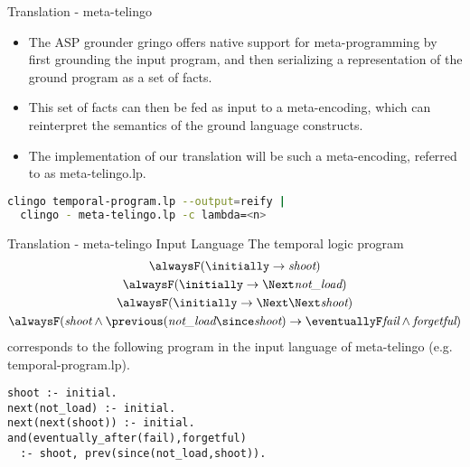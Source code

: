 \documentclass[aspectratio=169,xcolor=svgnames]{beamer}
\theoremstyle{theoremstyle_space}
\begin{document}
\begin{frame}[t,fragile]{Translation - meta-telingo}
  \begin{itemize}
  \item The ASP grounder gringo offers native support for
    meta-programming by first grounding the input program, and then
    serializing a representation of the ground program as a set of
    facts.
  \item This set of facts can then be fed as input to a meta-encoding,
    which can reinterpret the semantics of the ground language constructs.
  \item The implementation of our translation will be such a
    meta-encoding, referred to as meta-telingo.lp.
  \end{itemize}

\begin{lstlisting}[language=bash,numbers=none]
clingo temporal-program.lp --output=reify | 
  clingo - meta-telingo.lp -c lambda=<n>
\end{lstlisting}

\end{frame}

\begin{frame}[t,fragile]{Translation - meta-telingo Input Language}
The temporal logic program
\begin{equation*}
\begin{gathered}
\alwaysF (\initially \rightarrow \textit{shoot})\\
\alwaysF (\initially \rightarrow \Next\textit{not\_load})\\
\alwaysF (\initially \rightarrow \Next\Next\textit{shoot})\\
\alwaysF(\textit{shoot} \wedge \previous(\textit{not\_load} \since \textit{shoot})
\rightarrow \eventuallyF \textit{fail} \wedge \textit{forgetful})
\end{gathered}
\end{equation*}
corresponds to the following program in the input language of
meta-telingo (e.g. temporal-program.lp).
\begin{center}
    \begin{lstlisting}[numbers=none]
shoot :- initial.
next(not_load) :- initial.
next(next(shoot)) :- initial.
and(eventually_after(fail),forgetful) 
  :- shoot, prev(since(not_load,shoot)).
    \end{lstlisting}
\end{center}
\end{frame}
\end{document}
